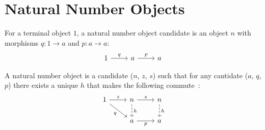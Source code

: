 \section{Natural Number Objects}
\begin{definition}

	For a terminal object $1$, a natural number object candidate is an object $n$
	with morphisms $q: 1 \to a$ and $p: a \to a$:
	\[\begin{tikzcd}[ampersand replacement=\&]
		1 \& a \& a
		\arrow["q", from=1-1, to=1-2]
		\arrow["p", from=1-2, to=1-3]
	\end{tikzcd}\]

	A natural number object is a candidate ($n$, $z$, $s$) such that for any
	cantidate ($a$, $q$, $p$) there exists a unique $h$ that makes the following
	commute~\parencite[p.~246]{awodey:category_theory}:
	\[\begin{tikzcd}[ampersand replacement=\&]
		1 \& n \& n \\
		\& a \& a
		\arrow["z", from=1-1, to=1-2]
		\arrow["q"', from=1-1, to=2-2]
		\arrow["s", from=1-2, to=1-3]
		\arrow["p"', from=2-2, to=2-3]
		\arrow["h", dashed, from=1-2, to=2-2]
		\arrow["h", dashed, from=1-3, to=2-3]
	\end{tikzcd}\]
\end{definition}
